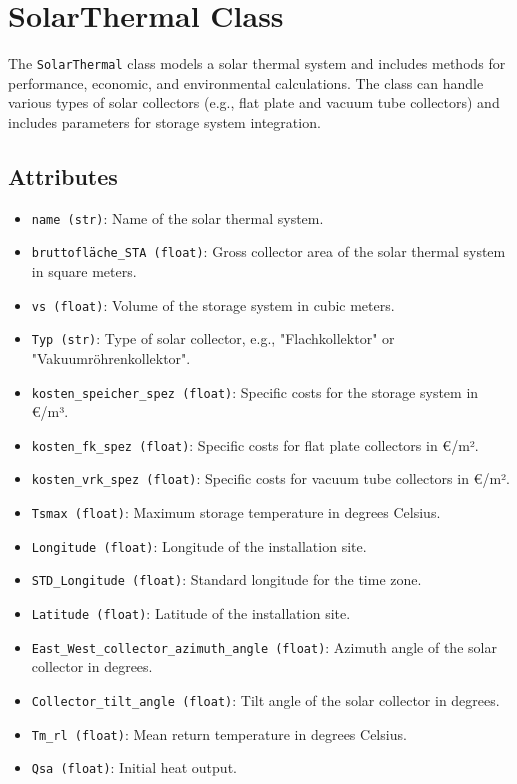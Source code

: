 \section{SolarThermal Class}
The \texttt{SolarThermal} class models a solar thermal system and includes methods for performance, economic, and environmental calculations. The class can handle various types of solar collectors (e.g., flat plate and vacuum tube collectors) and includes parameters for storage system integration.

\subsection{Attributes}
\begin{itemize}
    \item \texttt{name (str)}: Name of the solar thermal system.
    \item \texttt{bruttofläche\_STA (float)}: Gross collector area of the solar thermal system in square meters.
    \item \texttt{vs (float)}: Volume of the storage system in cubic meters.
    \item \texttt{Typ (str)}: Type of solar collector, e.g., "Flachkollektor" or "Vakuumröhrenkollektor".
    \item \texttt{kosten\_speicher\_spez (float)}: Specific costs for the storage system in €/m³.
    \item \texttt{kosten\_fk\_spez (float)}: Specific costs for flat plate collectors in €/m².
    \item \texttt{kosten\_vrk\_spez (float)}: Specific costs for vacuum tube collectors in €/m².
    \item \texttt{Tsmax (float)}: Maximum storage temperature in degrees Celsius.
    \item \texttt{Longitude (float)}: Longitude of the installation site.
    \item \texttt{STD\_Longitude (float)}: Standard longitude for the time zone.
    \item \texttt{Latitude (float)}: Latitude of the installation site.
    \item \texttt{East\_West\_collector\_azimuth\_angle (float)}: Azimuth angle of the solar collector in degrees.
    \item \texttt{Collector\_tilt\_angle (float)}: Tilt angle of the solar collector in degrees.
    \item \texttt{Tm\_rl (float)}: Mean return temperature in degrees Celsius.
    \item \texttt{Qsa (float)}: Initial heat output.

\end{itemize}
